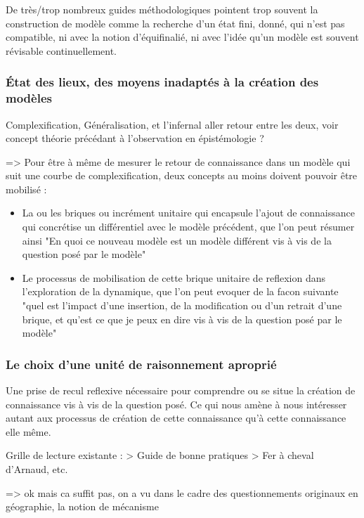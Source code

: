 De très/trop nombreux guides méthodologiques pointent trop souvent la construction de modèle comme la recherche d'un état fini, donné, qui n'est pas compatible, ni avec la notion d'équifinalié, ni avec l'idée qu'un modèle est souvent révisable continuellement.

\subsubsection{État des lieux, des moyens inadaptés à la création des modèles}

Complexification, Généralisation, et l'infernal aller retour entre les deux, voir concept théorie précédant à l'observation en épistémologie ?

=> Pour être à même de mesurer le retour de connaissance dans un modèle qui suit une courbe de complexification, deux concepts au moins doivent pouvoir être mobilisé : 

\begin{itemize}
\item La ou les briques ou incrément unitaire qui encapsule l'ajout de connaissance qui concrétise un différentiel avec le modèle précédent, que l'on peut résumer ainsi "En quoi ce nouveau modèle est un modèle différent vis à vis de la question posé par le modèle"
\item Le processus de mobilisation de cette brique unitaire de reflexion dans l'exploration de la dynamique, que l'on peut evoquer de la facon suivante "quel est l'impact d'une insertion, de la modification ou d'un retrait d'une brique, et qu'est ce que je peux en dire vis à vis de la question posé par le modèle"
\end{itemize}

\subsubsection{Le choix d'une unité de raisonnement aproprié}

Une prise de recul reflexive nécessaire pour comprendre ou se situe la création de connaissance vis à vis de la question posé.
Ce qui nous amène à nous intéresser autant aux processus de création de cette connaissance qu'à cette connaissance elle même.

Grille de lecture existante : 
> Guide de bonne pratiques
> Fer à cheval d'Arnaud, etc.

=> ok mais ca suffit pas, on a vu dans le cadre des questionnements originaux en géographie, la notion de mécanisme

